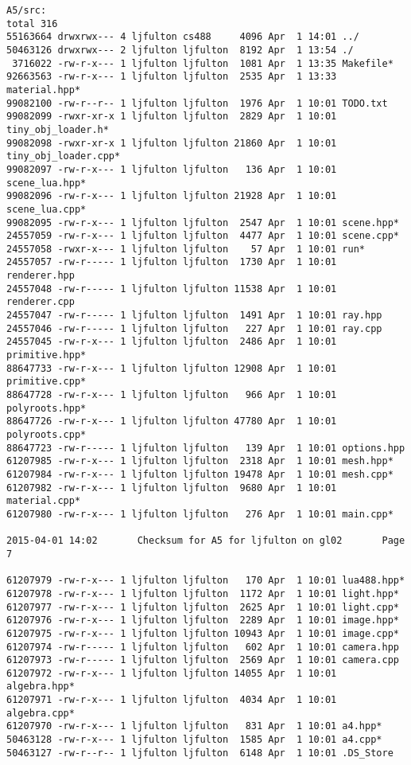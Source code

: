 \documentclass[12pt]{article}
\begin{document}
\begin{verbatim}
A5/src:
total 316
55163664 drwxrwx--- 4 ljfulton cs488     4096 Apr  1 14:01 ../
50463126 drwxrwx--- 2 ljfulton ljfulton  8192 Apr  1 13:54 ./
 3716022 -rw-r-x--- 1 ljfulton ljfulton  1081 Apr  1 13:35 Makefile*
92663563 -rw-r-x--- 1 ljfulton ljfulton  2535 Apr  1 13:33 material.hpp*
99082100 -rw-r--r-- 1 ljfulton ljfulton  1976 Apr  1 10:01 TODO.txt
99082099 -rwxr-xr-x 1 ljfulton ljfulton  2829 Apr  1 10:01 tiny_obj_loader.h*
99082098 -rwxr-xr-x 1 ljfulton ljfulton 21860 Apr  1 10:01 tiny_obj_loader.cpp*
99082097 -rw-r-x--- 1 ljfulton ljfulton   136 Apr  1 10:01 scene_lua.hpp*
99082096 -rw-r-x--- 1 ljfulton ljfulton 21928 Apr  1 10:01 scene_lua.cpp*
99082095 -rw-r-x--- 1 ljfulton ljfulton  2547 Apr  1 10:01 scene.hpp*
24557059 -rw-r-x--- 1 ljfulton ljfulton  4477 Apr  1 10:01 scene.cpp*
24557058 -rwxr-x--- 1 ljfulton ljfulton    57 Apr  1 10:01 run*
24557057 -rw-r----- 1 ljfulton ljfulton  1730 Apr  1 10:01 renderer.hpp
24557048 -rw-r----- 1 ljfulton ljfulton 11538 Apr  1 10:01 renderer.cpp
24557047 -rw-r----- 1 ljfulton ljfulton  1491 Apr  1 10:01 ray.hpp
24557046 -rw-r----- 1 ljfulton ljfulton   227 Apr  1 10:01 ray.cpp
24557045 -rw-r-x--- 1 ljfulton ljfulton  2486 Apr  1 10:01 primitive.hpp*
88647733 -rw-r-x--- 1 ljfulton ljfulton 12908 Apr  1 10:01 primitive.cpp*
88647728 -rw-r-x--- 1 ljfulton ljfulton   966 Apr  1 10:01 polyroots.hpp*
88647726 -rw-r-x--- 1 ljfulton ljfulton 47780 Apr  1 10:01 polyroots.cpp*
88647723 -rw-r----- 1 ljfulton ljfulton   139 Apr  1 10:01 options.hpp
61207985 -rw-r-x--- 1 ljfulton ljfulton  2318 Apr  1 10:01 mesh.hpp*
61207984 -rw-r-x--- 1 ljfulton ljfulton 19478 Apr  1 10:01 mesh.cpp*
61207982 -rw-r-x--- 1 ljfulton ljfulton  9680 Apr  1 10:01 material.cpp*
61207980 -rw-r-x--- 1 ljfulton ljfulton   276 Apr  1 10:01 main.cpp*

2015-04-01 14:02       Checksum for A5 for ljfulton on gl02       Page 7

61207979 -rw-r-x--- 1 ljfulton ljfulton   170 Apr  1 10:01 lua488.hpp*
61207978 -rw-r-x--- 1 ljfulton ljfulton  1172 Apr  1 10:01 light.hpp*
61207977 -rw-r-x--- 1 ljfulton ljfulton  2625 Apr  1 10:01 light.cpp*
61207976 -rw-r-x--- 1 ljfulton ljfulton  2289 Apr  1 10:01 image.hpp*
61207975 -rw-r-x--- 1 ljfulton ljfulton 10943 Apr  1 10:01 image.cpp*
61207974 -rw-r----- 1 ljfulton ljfulton   602 Apr  1 10:01 camera.hpp
61207973 -rw-r----- 1 ljfulton ljfulton  2569 Apr  1 10:01 camera.cpp
61207972 -rw-r-x--- 1 ljfulton ljfulton 14055 Apr  1 10:01 algebra.hpp*
61207971 -rw-r-x--- 1 ljfulton ljfulton  4034 Apr  1 10:01 algebra.cpp*
61207970 -rw-r-x--- 1 ljfulton ljfulton   831 Apr  1 10:01 a4.hpp*
50463128 -rw-r-x--- 1 ljfulton ljfulton  1585 Apr  1 10:01 a4.cpp*
50463127 -rw-r--r-- 1 ljfulton ljfulton  6148 Apr  1 10:01 .DS_Store


\end{verbatim}
\end{document}
